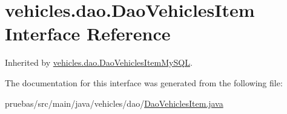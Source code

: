 \hypertarget{interfacevehicles_1_1dao_1_1_dao_vehicles_item}{}\section{vehicles.\+dao.\+Dao\+Vehicles\+Item Interface Reference}
\label{interfacevehicles_1_1dao_1_1_dao_vehicles_item}


Inherited by \mbox{\hyperlink{classvehicles_1_1dao_1_1_dao_vehicles_item_my_s_q_l}{vehicles.\+dao.\+Dao\+Vehicles\+Item\+My\+S\+QL}}.



The documentation for this interface was generated from the following file\+:\begin{DoxyCompactItemize}
\item 
pruebas/src/main/java/vehicles/dao/\mbox{\hyperlink{_dao_vehicles_item_8java}{Dao\+Vehicles\+Item.\+java}}\end{DoxyCompactItemize}
